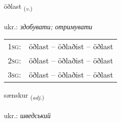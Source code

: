 \documentclass[frontgrid, backgrid]{flacards}\usepackage[]{graphicx}\usepackage[]{xcolor}
\begin{document}
\renewcommand{\flhead}{\vskip5pt \fboxsep=0pt {\small\bfseries\footnotesize Sagnorð | дієслово}}
\renewcommand{\fcfoot}{\vskip5pt \fboxsep=0pt \hspace{2pt}{\small\bfseries\footnotesize 2K}}

\renewcommand{\blhead}{\vskip5pt {\small\bfseries\footnotesize Sagnorð | дієслово }}
\renewcommand{\bcfoot}{\vskip5pt \hspace{2pt}{\small\bfseries\footnotesize 2K}}


{öðlast \small{\textsubscript{(\textit{v.})}} \\[1ex] %
\textphonetic{[œðlast]} \\
ukr.: \emph{здобувати; отримувати} \\  [2ex]
\renewcommand*{\arraystretch}{0.8}
\begin{tabular}{p{1cm}l}
\textsc{1sg}: & öðlast -- öðlaðist -- öðlast \\ 
\textsc{2sg}: & öðlast -- öðlaðist -- öðlast \\ 
\textsc{3sg}: & öðlast -- öðlaðist -- öðlast \\ 
\end{tabular}
}

\renewcommand{\flhead}{\vskip5pt \fboxsep=0pt {\small\bfseries\footnotesize Lýsingarorð | прикметник}}
\renewcommand{\fcfoot}{\vskip5pt \fboxsep=0pt \hspace{2pt}{\small\bfseries\footnotesize 2K}}

\renewcommand{\blhead}{\vskip5pt {\small\bfseries\footnotesize Lýsingarorð | прикметник }}
\renewcommand{\bcfoot}{\vskip5pt \hspace{2pt}{\small\bfseries\footnotesize 2K}}


{sænskur \small{\textsubscript{(\textit{adj.})}} \\[1ex] %
\textphonetic{[sainskʏr]} \\
ukr.: \emph{шведський} \\  [2ex]
\renewcommand*{\arraystretch}{0.8}
}
\end{document}
